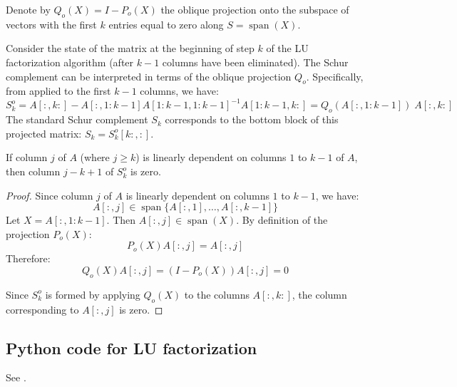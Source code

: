 \documentclass[10pt,twoside]{siamart1116}
\DeclareMathOperator{\spn}{span}
\numberwithin{theorem}{section}
\begin{document}
Denote by $Q_o(X) = I - P_o(X)$ the oblique projection onto the subspace of vectors with the first $k$ entries equal to zero along $S=\spn(X)$.

Consider the state of the matrix at the beginning of step $k$ of the LU factorization algorithm (after $k-1$ columns have been eliminated). The Schur complement can be interpreted in terms of the oblique projection $Q_o$. Specifically, from  applied to the first $k-1$ columns, we have:
\[ S^o_k = A[:,k:] - A[:,1:k-1] {A[1:k-1,1:k-1]}^{-1} A[1:k-1,k:]
	= Q_o(A[:,1:k-1]) \; A[:,k:]
\]
The standard Schur complement $S_k$ corresponds to the bottom block of this projected matrix: $S_k = S^o_k[k:,:]$.

\begin{lemma}\label{lem:oblique}
	If column $j$ of $A$ (where $j \ge k$) is linearly dependent on columns $1$ to $k-1$ of $A$, then column $j - k + 1$ of $S^o_k$ is zero.
\end{lemma}

\begin{proof}
	Since column $j$ of $A$ is linearly dependent on columns $1$ to $k-1$, we have:
	\[ A[:,j] \in \spn\{ A[:,1], \ldots, A[:,k-1] \} \] %
	Let $X = A[:,1:k-1]$. Then $A[:,j] \in \spn(X)$. By definition of the projection $P_o(X)$:
	\[ P_o(X) A[:,j] = A[:,j] \]
	Therefore:
	\[ Q_o(X) A[:,j] = (I - P_o(X)) A[:,j] = 0 \]

	Since $S^o_k$ is formed by applying $Q_o(X)$ to the columns $A[:,k:]$, the column corresponding to $A[:,j]$ is zero.
\end{proof}

\subsection{Python code for LU factorization}\label{sec:python_restricted_pivoting}

See .


\end{document}
